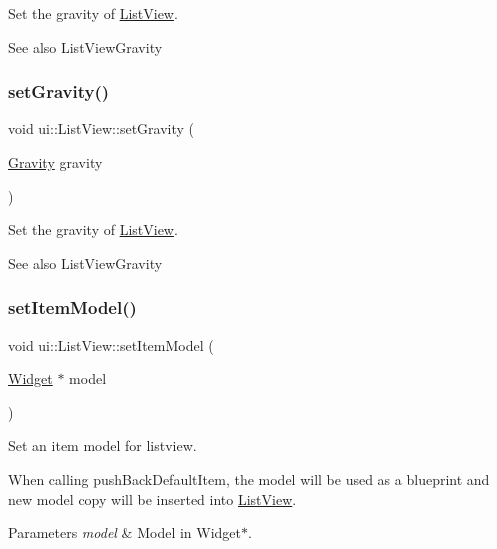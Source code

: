 Set the gravity of \hyperlink{classui_1_1ListView}{List\+View}. \begin{DoxySeeAlso}{See also}
{\ttfamily List\+View\+Gravity} 
\end{DoxySeeAlso}
\mbox{\label{classui_1_1ListView_ae65016cdf079cded10de1db27fff4be9}} 
\subsubsection{\texorpdfstring{set\+Gravity()}{setGravity()}\hspace{0.1cm}{\footnotesize\ttfamily [2/2]}}
{\footnotesize\ttfamily void ui\+::\+List\+View\+::set\+Gravity (\begin{DoxyParamCaption}\item[{\hyperlink{classui_1_1ListView_af79b44631b38c1782c384830acf20cf6}{Gravity}}]{gravity }\end{DoxyParamCaption})}

Set the gravity of \hyperlink{classui_1_1ListView}{List\+View}. \begin{DoxySeeAlso}{See also}
{\ttfamily List\+View\+Gravity} 
\end{DoxySeeAlso}
\mbox{\label{classui_1_1ListView_ab925e8282e44c05155b27b27d4a05808}} 
\subsubsection{\texorpdfstring{set\+Item\+Model()}{setItemModel()}\hspace{0.1cm}{\footnotesize\ttfamily [1/2]}}
{\footnotesize\ttfamily void ui\+::\+List\+View\+::set\+Item\+Model (\begin{DoxyParamCaption}\item[{\hyperlink{classui_1_1Widget}{Widget} $\ast$}]{model }\end{DoxyParamCaption})}

Set an item model for listview.

When calling {\ttfamily push\+Back\+Default\+Item}, the model will be used as a blueprint and new model copy will be inserted into \hyperlink{classui_1_1ListView}{List\+View}. 
\begin{DoxyParams}{Parameters}
{\em model} & Model in {\ttfamily Widget$\ast$}. \\
\hline
\end{DoxyParams}
\mbox{\label{classui_1_1ListView_ab925e8282e44c05155b27b27d4a05808}} 
